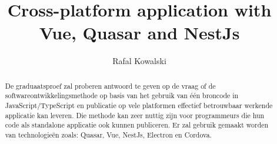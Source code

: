 \documentclass{hogent-article}
\title{Cross-platform application with Vue, Quasar and NestJs}
\author{Rafal Kowalski}
\begin{document}
\begin{abstract}
  De graduaatsproef zal proberen antwoord te geven op de vraag of de softwareontwikkelingsmethode op basis van het gebruik van één broncode in JavaScript/TypeScript en publicatie op vele platformen effectief betrouwbaar werkende applicatie kan leveren. Die methode kan zeer nuttig zijn voor programmeurs die hun code als standalone applicatie ook kunnen publiceren. Er zal gebruik gemaakt worden van technologieën zoals: Quasar, Vue, NestJs, Electron en Cordova.
\end{abstract}

\tableofcontents



\printbibliography[heading=bibintoc]
\end{document}
